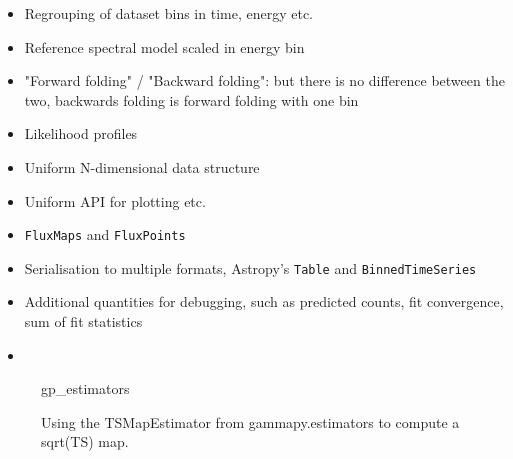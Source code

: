 \begin{itemize}
	\item Regrouping of dataset bins in time, energy etc.
	\item Reference spectral model scaled in energy bin
	\item "Forward folding" / "Backward folding": but there is no
	      difference between the two, backwards folding is forward folding with one bin
	\item Likelihood profiles \item Uniform N-dimensional data structure \item
	      Uniform API for plotting etc. \item \verb|FluxMaps| and \verb|FluxPoints| \item
	      Serialisation to multiple formats, Astropy's \verb|Table| and
	      \verb|BinnedTimeSeries|
	\item Additional quantities for debugging, such as predicted counts, fit convergence,
	      sum of fit statistics \item \end{itemize}

\begin{figure}
	{gp_estimators}
	\caption{Using the TSMapEstimator from gammapy.estimators to compute a
		sqrt(TS) map.} \label{fig*:minted:gp_estimators} \end{figure}
